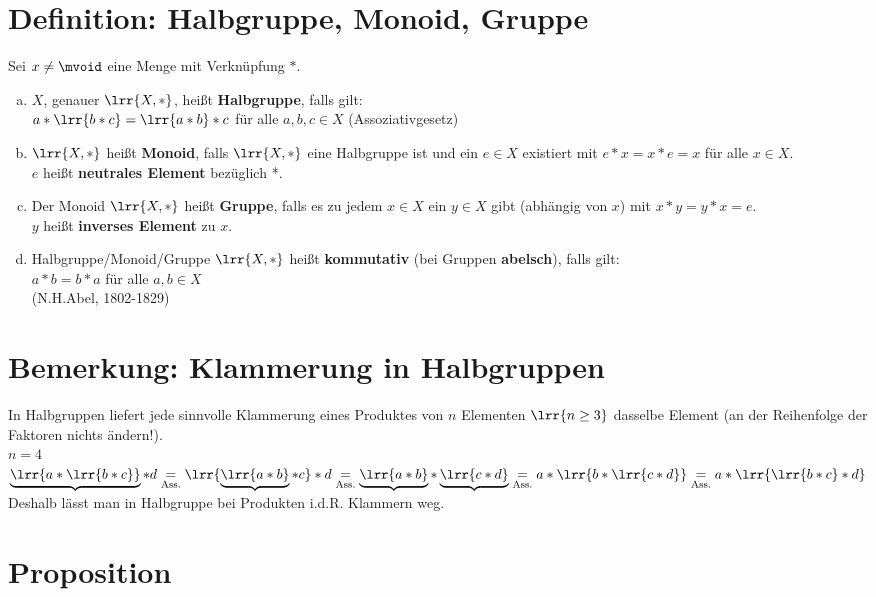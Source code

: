 \section{Definition: Halbgruppe, Monoid, Gruppe}
	Sei $x\neq\mvoid$ eine Menge mit Verknüpfung $*$.
	\begin{enumerate}[a)]
		\item $X$, genauer $\lrr{X,*}$, heißt \textbf{Halbgruppe}, falls gilt: \\
			$a*\lrr{b*c}=\lrr{a*b}*c$ für alle $a,b,c\in X$ (Assoziativgesetz)
		\item $\lrr{X,*}$ heißt \textbf{Monoid}, falls $\lrr{X,*}$ eine Halbgruppe ist und ein $e\in X$ existiert mit $e*x=x*e=x$ für alle $x\in X$. \\
			$e$ heißt \textbf{neutrales Element} bezüglich *.
		\item Der Monoid $\lrr{X,*}$ heißt \textbf{Gruppe}, falls es zu jedem $x\in X$ ein $y\in X$ gibt (abhängig von $x$) mit $x*y=y*x = e$.\\
			$y$ heißt \textbf{inverses Element} zu $x$.
		\item Halbgruppe/Monoid/Gruppe $\lrr{X,*}$ heißt \textbf{kommutativ} (bei Gruppen \textbf{abelsch}), falls gilt:\\
			$a*b=b*a$ für alle $a,b\in X$ \\
			(N.H.Abel, 1802-1829)
	\end{enumerate}
\section{Bemerkung: Klammerung in Halbgruppen}
	In Halbgruppen liefert jede sinnvolle Klammerung eines Produktes von $n$ Elementen $\lrr{n\geq 3}$ dasselbe Element (an der Reihenfolge der Faktoren nichts ändern!).\\
	$n=4$\\
	$\underbrace{\lrr{a*\lrr{b*c}}}*d\underset{\mbox{\scriptsize Ass.}}{=}\lrr{\underbrace{\lrr{a*b}}*c}*d\underset{\mbox{\scriptsize Ass.}}{=}\underbrace{\lrr{a*b}}*\underbrace{\lrr{c*d}}\underset{\mbox{\scriptsize Ass.}}{=}a*\lrr{b*\lrr{c*d}}\underset{\mbox{\scriptsize Ass.}}{=}a*\lrr{\lrr{b*c}*d}$\\
	Deshalb lässt man in Halbgruppe bei Produkten i.d.R. Klammern weg.

	\section{Proposition}

